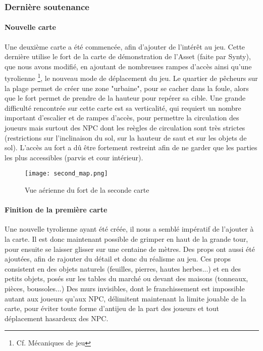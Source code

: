 \vspace{0.5cm}
\subsubsection{Dernière soutenance}
\vspace{0.5cm}

    \paragraph{Nouvelle carte}

    Une deuxième carte a été commencée, afin d'ajouter de l'intérêt au jeu. Cette dernière utilise le fort de la carte 
    de démonstration de l'Asset (faite par Synty), que nous avons modifié, en ajoutant de nombreuses rampes d'accès ainsi qu'une tyrolienne \footnote{Cf. Mécaniques de jeu}, 
    le nouveau mode de déplacement du jeu. Le quartier de pêcheurs sur la plage permet de créer une zone "urbaine", pour se 
    cacher dans la foule, alors que le fort permet de prendre de la hauteur pour repérer sa cible. Une grande difficulté rencontrée sur 
    cette carte est sa verticalité, qui requiert un nombre important d'escalier et de rampes d'accès, pour permettre la 
    circulation des joueurs mais surtout des NPC dont les reègles de circulation sont très strictes (restrictions sur l'inclinaison 
    du sol, sur la hauteur de saut et sur les objets de sol). L'accès au fort a dû être fortement restreint afin de ne garder 
    que les parties les plus accessibles (parvis et cour intérieur).

    \begin{figure}[hbt!]
        \centering
        \texttt{[image: second\_map.png]}
        \caption{Vue aérienne du fort de la seconde carte}
    \end{figure}
    \FloatBarrier


    \paragraph{Finition de la première carte}

    Une nouvelle tyrolienne ayant été créée, il nous a semblé impératif de l'ajouter à la carte. Il est donc maintenant possible 
    de grimper en haut de la grande tour, pour ensuite se laisser glisser sur une centaine de mètres. Des props ont aussi 
    été ajoutées, afin de rajouter du détail et donc du réalisme au jeu. Ces props consistent en des objets naturels (feuilles, pierres, 
    hautes herbes...) et en des petits objets, posés sur les tables du marché ou devant des maisons (tonneaux, pièces, boussoles...)
    Des murs invisibles, dont le franchissement est impossible autant aux joueurs qu'aux NPC, délimitent maintenant la limite 
    jouable de la carte, pour éviter toute forme d'antijeu de la part des joueurs et tout déplacement hasardeux des NPC.
    

